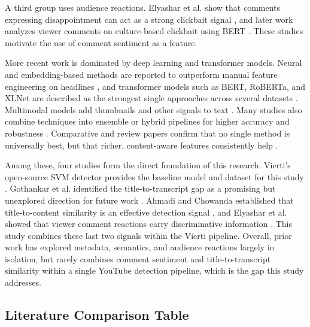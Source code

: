 \documentclass[conference]{IEEEtran}
\begin{document}
A third group uses audience reactions. Elyashar et al. show that comments expressing disappointment can act as a strong clickbait signal \cite{elyashar2022}, and later work analyzes viewer comments on culture-based clickbait using BERT \cite{pinoybait2024}. These studies motivate the use of comment sentiment as a feature.

More recent work is dominated by deep learning and transformer models. Neural and embedding-based methods are reported to outperform manual feature engineering on headlines \cite{multistrategy2018, bilstm2024}, and transformer models such as BERT, RoBERTa, and XLNet are described as the strongest single approaches across several datasets \cite{roberta2022, indonesiabert2023, robertalarge2025, bestmodel2021}. Multimodal models add thumbnails and other signals to text \cite{rahman2023}. Many studies also combine techniques into ensemble or hybrid pipelines for higher accuracy and robustness \cite{ensemble2025, hybridfakenews2025, cnnlstm2020, rumor2022}. Comparative and review papers confirm that no single method is universally best, but that richer, content-aware features consistently help \cite{bronakowski2023, comparative2023, litreview2024}.

Among these, four studies form the direct foundation of this research. Vierti's open-source SVM detector provides the baseline model and dataset for this study \cite{vierti2019}. Gothankar et al. identified the title-to-transcript gap as a promising but unexplored direction for future work \cite{gothankar2022}. Ahmadi and Chowanda established that title-to-content similarity is an effective detection signal \cite{ahmadi2023}, and Elyashar et al. showed that viewer comment reactions carry discriminative information \cite{elyashar2022}. This study combines these last two signals within the Vierti pipeline. Overall, prior work has explored metadata, semantics, and audience reactions largely in isolation, but rarely combines comment sentiment and title-to-transcript similarity within a single YouTube detection pipeline, which is the gap this study addresses.








 
\subsection{Literature Comparison Table}
 
\end{document}
